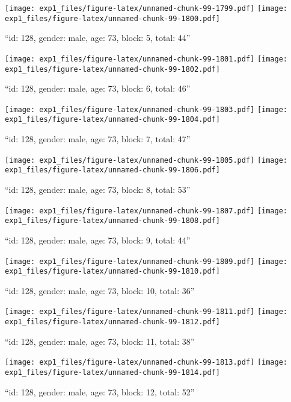 \documentclass[,]{article}
\begin{document}
\texttt{[image: exp1\_files/figure-latex/unnamed-chunk-99-1799.pdf]}
\texttt{[image: exp1\_files/figure-latex/unnamed-chunk-99-1800.pdf]}

\newpage
[1] 

``id: 128, gender: male, age: 73, block: 5, total: 44''

\texttt{[image: exp1\_files/figure-latex/unnamed-chunk-99-1801.pdf]}
\texttt{[image: exp1\_files/figure-latex/unnamed-chunk-99-1802.pdf]}

\newpage
[1] 

``id: 128, gender: male, age: 73, block: 6, total: 46''

\texttt{[image: exp1\_files/figure-latex/unnamed-chunk-99-1803.pdf]}
\texttt{[image: exp1\_files/figure-latex/unnamed-chunk-99-1804.pdf]}

\newpage
[1] 

``id: 128, gender: male, age: 73, block: 7, total: 47''

\texttt{[image: exp1\_files/figure-latex/unnamed-chunk-99-1805.pdf]}
\texttt{[image: exp1\_files/figure-latex/unnamed-chunk-99-1806.pdf]}

\newpage
[1] 

``id: 128, gender: male, age: 73, block: 8, total: 53''

\texttt{[image: exp1\_files/figure-latex/unnamed-chunk-99-1807.pdf]}
\texttt{[image: exp1\_files/figure-latex/unnamed-chunk-99-1808.pdf]}

\newpage
[1] 

``id: 128, gender: male, age: 73, block: 9, total: 44''

\texttt{[image: exp1\_files/figure-latex/unnamed-chunk-99-1809.pdf]}
\texttt{[image: exp1\_files/figure-latex/unnamed-chunk-99-1810.pdf]}

\newpage
[1] 

``id: 128, gender: male, age: 73, block: 10, total: 36''

\texttt{[image: exp1\_files/figure-latex/unnamed-chunk-99-1811.pdf]}
\texttt{[image: exp1\_files/figure-latex/unnamed-chunk-99-1812.pdf]}

\newpage
[1] 

``id: 128, gender: male, age: 73, block: 11, total: 38''

\texttt{[image: exp1\_files/figure-latex/unnamed-chunk-99-1813.pdf]}
\texttt{[image: exp1\_files/figure-latex/unnamed-chunk-99-1814.pdf]}

\newpage
[1] 

``id: 128, gender: male, age: 73, block: 12, total: 52''
\end{document}
